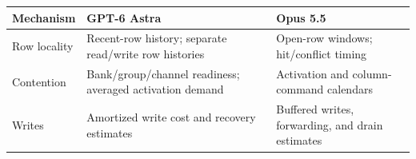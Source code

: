 \begingroup\footnotesize\setlength{\tabcolsep}{3pt}\renewcommand{\arraystretch}{1.06}
\begin{tabular}{@{}p{}p{}p{}@{}}
\toprule
\raggedright Mechanism & \raggedright GPT-6 Astra & \raggedright Opus 5.5 \tabularnewline
\midrule
\raggedright Row locality & \raggedright Recent-row history; separate read/write row histories & \raggedright Open-row windows; hit/conflict timing \tabularnewline
\raggedright Contention & \raggedright Bank/group/channel readiness; averaged activation demand & \raggedright Activation and column-command calendars \tabularnewline
\raggedright Writes & \raggedright Amortized write cost and recovery estimates & \raggedright Buffered writes, forwarding, and drain estimates \tabularnewline
\bottomrule
\end{tabular}\endgroup
